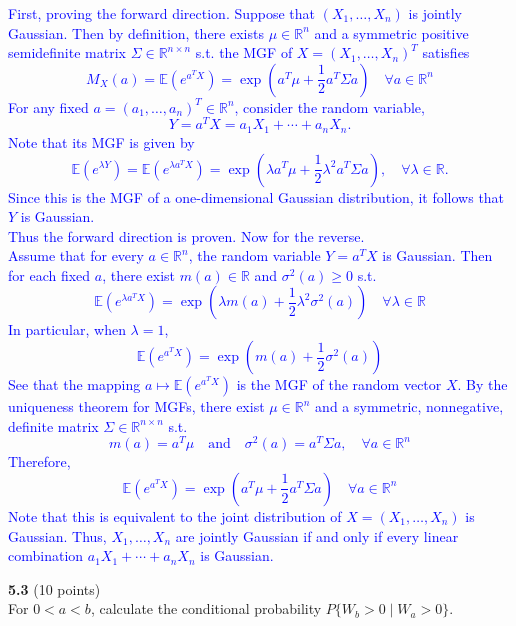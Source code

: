 \documentclass{article}
\begin{document}
\textcolor{blue}{
First, proving the forward direction. Suppose that $(X_1,\dots,X_n)$ is jointly Gaussian. Then by definition, there exists $\mu\in\mathbb{R}^n$ and a symmetric positive semidefinite matrix $\Sigma\in\mathbb{R}^{n\times n}$ s.t. the MGF of $X=(X_1,\dots,X_n)^T$ satisfies
\[
M_X(a)=\mathbb{E}\left(e^{a^T X}\right)=\exp\left(a^T\mu+\frac{1}{2}a^T\Sigma a\right) \quad\forall a\in\mathbb{R}^n
\]
For any fixed $a=(a_1,\dots,a_n)^T\in\mathbb{R}^n$, consider the random variable,
\[
Y=a^T X=a_1X_1+\cdots+a_nX_n.
\]
Note that its MGF is given by 
\[
    \mathbb{E}\left(e^{\lambda Y}\right)=\mathbb{E}\left(e^{\lambda a^T X}\right)=\exp\left(\lambda a^T\mu+\frac{1}{2}\lambda^2 a^T\Sigma a\right), \quad \forall \lambda\in\mathbb{R}.
\]
Since this is the MGF of a one-dimensional Gaussian distribution, it follows that $Y$ is Gaussian. \\
Thus the forward direction is proven. Now for the reverse. \\
Assume that for every $a\in\mathbb{R}^n$, the random variable $Y=a^T X$ is Gaussian. Then for each fixed $a$, there exist $m(a)\in\mathbb{R}$ and $\sigma^2(a)\ge0$ s.t.
\[
    \mathbb{E}\left(e^{\lambda a^T X}\right)=\exp\left(\lambda m(a)+\frac{1}{2}\lambda^2\sigma^2(a)\right)\quad \forall \lambda\in\mathbb{R}
\]
In particular, when $\lambda=1$,
\[
\mathbb{E}\left(e^{a^T X}\right)=\exp\left(m(a)+\frac{1}{2}\sigma^2(a)\right)
\]
See that the mapping $a\mapsto \mathbb{E}\left(e^{a^T X}\right)$ is the MGF of the random vector $X$. By the uniqueness theorem for MGFs, there exist $\mu\in\mathbb{R}^n$ and a symmetric, nonnegative, definite matrix $\Sigma\in\mathbb{R}^{n\times n}$ s.t.
\[
    m(a)=a^T\mu\quad \text{and}\quad \sigma^2(a)=a^T\Sigma a, \quad \forall a\in\mathbb{R}^n
\]
Therefore,
\[
\mathbb{E}\left(e^{a^T X}\right)=\exp\left(a^T\mu+\frac{1}{2}a^T\Sigma a\right) \quad\forall a\in\mathbb{R}^n
\]
Note that this is equivalent to the joint distribution of $X=(X_1,\dots,X_n)$ is Gaussian.
Thus, $X_1,\dots,X_n$ are jointly Gaussian if and only if every linear combination $a_1X_1+\cdots+a_nX_n$ is Gaussian.
}



\noindent \textbf{5.3} (10 points) \\ For $0 < a < b$, calculate the conditional
probability $P\{W_b > 0 \mid W_a > 0\}$. 

\end{document}
